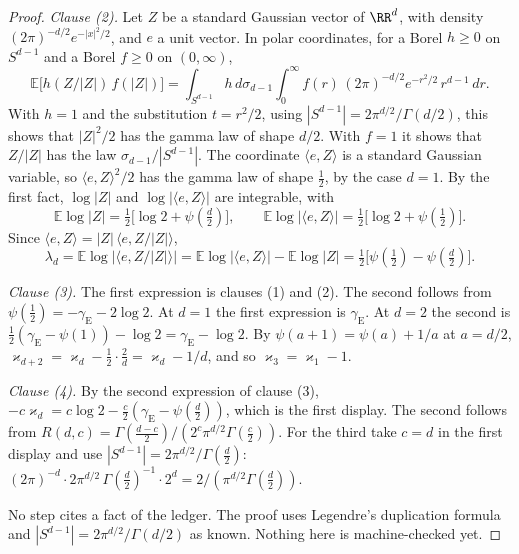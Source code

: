 \begin{proof}
\emph{Clause (2).} Let $Z$ be a standard Gaussian vector of $\RR^d$, with density
$(2\pi)^{-d/2}e^{-|x|^2/2}$, and $e$ a unit vector. In polar coordinates, for a Borel
$h \ge 0$ on $S^{d-1}$ and a Borel $f \ge 0$ on $(0,\infty)$,
\[
  \mathbb{E}\bigl[h(Z/|Z|)\,f(|Z|)\bigr]
   = \int_{S^{d-1}}h\,d\sigma_{d-1}\int_0^\infty f(r)\,(2\pi)^{-d/2}e^{-r^2/2}\,r^{d-1}\,dr .
\]
With $h = 1$ and the substitution $t = r^2/2$, using $|S^{d-1}| = 2\pi^{d/2}/\Gamma(d/2)$, this
shows that $|Z|^2/2$ has the gamma law of shape $d/2$. With $f = 1$ it shows that $Z/|Z|$ has the
law $\sigma_{d-1}/|S^{d-1}|$. The coordinate $\langle e,Z\rangle$ is a standard Gaussian variable,
so $\langle e,Z\rangle^2/2$ has the gamma law of shape $\tfrac12$, by the case $d = 1$. By the
first fact, $\log|Z|$ and $\log|\langle e,Z\rangle|$ are integrable, with
\[
  \mathbb{E}\log|Z| = \tfrac12\bigl[\log 2 + \psi(\tfrac d2)\bigr], \qquad
  \mathbb{E}\log|\langle e,Z\rangle| = \tfrac12\bigl[\log 2 + \psi(\tfrac12)\bigr] .
\]
Since $\langle e,Z\rangle = |Z|\,\langle e, Z/|Z|\rangle$,
\[
  \lambda_d = \mathbb{E}\log\bigl|\langle e, Z/|Z|\rangle\bigr|
   = \mathbb{E}\log|\langle e,Z\rangle| - \mathbb{E}\log|Z|
   = \tfrac12\bigl[\psi(\tfrac12) - \psi(\tfrac d2)\bigr] .
\]

\emph{Clause (3).} The first expression is clauses (1) and (2). The second follows from
$\psi(\tfrac12) = -\gamma_{\mathrm E} - 2\log 2$. At $d = 1$ the first expression is
$\gamma_{\mathrm E}$. At $d = 2$ the second is
$\tfrac12(\gamma_{\mathrm E} - \psi(1)) - \log 2 = \gamma_{\mathrm E} - \log 2$. By
$\psi(a+1) = \psi(a) + 1/a$ at $a = d/2$,
$\varkappa_{d+2} = \varkappa_d - \tfrac12\cdot\tfrac2d = \varkappa_d - 1/d$, and so
$\varkappa_3 = \varkappa_1 - 1$.

\emph{Clause (4).} By the second expression of clause (3),
$-c\varkappa_d = c\log 2 - \tfrac c2(\gamma_{\mathrm E} - \psi(\tfrac d2))$, which is the first
display. The second follows from
$R(d,c) = \Gamma(\tfrac{d-c}{2})/(2^{c}\pi^{d/2}\Gamma(\tfrac c2))$. For the third take $c = d$
in the first display and use $|S^{d-1}| = 2\pi^{d/2}/\Gamma(\tfrac d2)$:
$(2\pi)^{-d}\cdot 2\pi^{d/2}\,\Gamma(\tfrac d2)^{-1}\cdot 2^{d} = 2/(\pi^{d/2}\Gamma(\tfrac d2))$.

No step cites a fact of the ledger. The proof uses Legendre's duplication formula and
$|S^{d-1}| = 2\pi^{d/2}/\Gamma(d/2)$ as known. Nothing here is machine-checked yet.
\end{proof}

